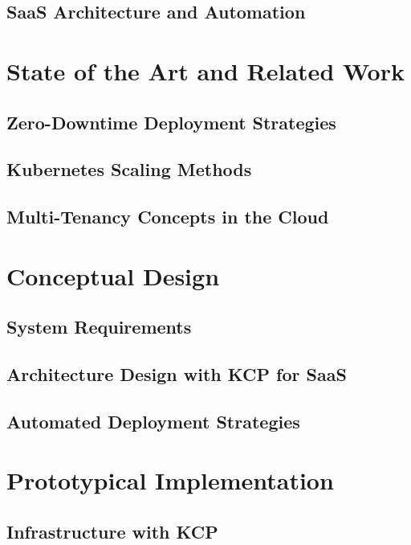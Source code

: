 \documentclass[11pt, a4paper, oneside, draft]{scrartcl}
\begin{document}
        \subsection{SaaS Architecture and Automation}

    \section{State of the Art and Related Work}

        \subsection{Zero-Downtime Deployment Strategies}

        \subsection{Kubernetes Scaling Methods}

        \subsection{Multi-Tenancy Concepts in the Cloud}

    \section{Conceptual Design}

        \subsection{System Requirements}

        \subsection{Architecture Design with KCP for SaaS}

        \subsection{Automated Deployment Strategies}

    \section{Prototypical Implementation}

        \subsection{Infrastructure with KCP}
\end{document}
